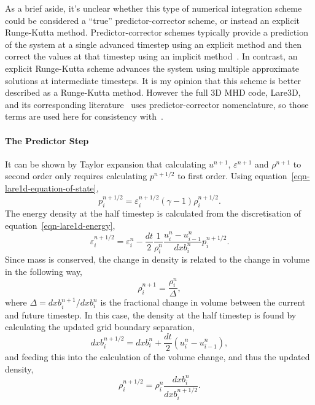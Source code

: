 As a brief aside, it's unclear whether this type of numerical integration scheme could be considered a ``true'' predictor-corrector scheme, or instead an explicit Runge-Kutta method. Predictor-corrector schemes typically provide a prediction of the system at a single advanced timestep using an explicit method and then correct the values at that timestep using an implicit method~\cite{butcherNumericalMethodsOrdinary2004}. In contrast, an explicit Runge-Kutta scheme advances the system using multiple approximate solutions at intermediate timesteps. It is my opinion that this scheme is better described as a Runge-Kutta method. However the full 3D MHD code, Lare3D, and its corresponding literature~\cite{arberStaggeredGridLagrangian2001} uses predictor-corrector nomenclature, so those terms are used here for consistency with~\cite{arberStaggeredGridLagrangian2001}.

\paragraph{The Predictor Step}
It can be shown by Taylor expansion that calculating $u^{n+1}$, $\varepsilon^{n+1}$ and $\rho^{n+1}$ to second order only requires calculating $p^{n+1/2}$ to first order. Using equation~\eqref{eqn-lare1d-equation-of-state},
\begin{equation}
  p_i^{n+1/2} = \varepsilon_i^{n+1/2}(\gamma-1)\rho_i^{n+1/2}.
  \label{eqn-predictor-pressure}
\end{equation}
The energy density at the half timestep is calculated from the discretisation of equation~\eqref{eqn-lare1d-energy},
\begin{equation}
  \varepsilon_i^{n+1/2} = \varepsilon_i^{n} - \frac{dt}{2} \frac{1}{\rho_i^n} \frac{u_i^n - u_{i-1}^n}{dxb_i^n}p_i^{n+1/2}.
  \label{eqn-predictor-energy}
\end{equation}
Since mass is conserved, the change in density is related to the change in volume in the following way,
\begin{equation}
  \rho_i^{n+1} = \frac{\rho_i^{n}}{\Delta},
\end{equation}
where $\Delta = dxb_i^{n+1}/dxb_i^{n}$ is the fractional change in volume between the current and future timestep. In this case, the density at the half timestep is found by calculating the updated grid boundary separation,
\begin{equation}
  dxb_i^{n+1/2} = dxb_i^n + \frac{dt}{2}(u_i^n - u_{i-1}^n),
  \label{eqn-predictor-boundary-distance}
\end{equation}
and feeding this into the calculation of the volume change, and thus the updated density,
\begin{equation}
  \rho_i^{n+1/2} = \rho_i^n \frac{dxb_i^n}{dxb_i^{n+1/2}}.
  \label{eqn-predictor-density}
\end{equation}

